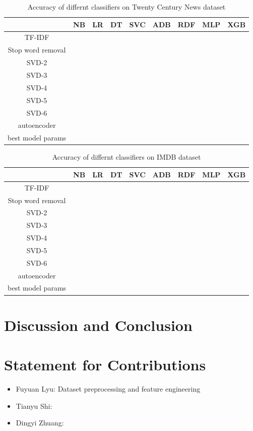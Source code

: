 \documentclass[11pt]{scrartcl}
\begin{document}
\begin{table}[H]
    \centering
    \begin{tabular}{c|cccccccc}
        \hline
         & NB   & LR & DT & SVC & ADB & RDF & MLP & XGB \\
        \hline
        TF-IDF & & & & & & & & \\
		Stop word removal & & & & & & & & \\
		SVD-2 & & & & & & & & \\
		SVD-3 & & & & & & & & \\
		SVD-4 & & & & & & & & \\
		SVD-5 & & & & & & & & \\
		SVD-6 & & & & & & & & \\
		autoencoder & & & & & & & & \\
		best model params & & & & & & & & \\
        \hline
    \end{tabular} 
    \caption{Accuracy of differnt classifiers on Twenty Century News dataset}
    \label{accuracy_20}
\end{table}

\begin{table}[H]
    \centering
    \begin{tabular}{c|cccccccc}
        \hline
         & NB   & LR & DT & SVC & ADB & RDF & MLP & XGB \\
        \hline
        TF-IDF & & & & & & & & \\
		Stop word removal & & & & & & & & \\
		SVD-2 & & & & & & & & \\
		SVD-3 & & & & & & & & \\
		SVD-4 & & & & & & & & \\
		SVD-5 & & & & & & & & \\
		SVD-6 & & & & & & & & \\
		autoencoder & & & & & & & & \\
		best model params & & & & & & & & \\
        \hline
    \end{tabular} 
    \caption{Accuracy of differnt classifiers on IMDB dataset}
    \label{accuracy_imdb}
\end{table}

\section{Discussion and Conclusion}

\section{Statement for Contributions}
\begin{itemize}
	\item Fuyuan Lyu: Dataset preprocessing and feature engineering
	\item Tianyu Shi:
	\item Dingyi Zhuang:
\end{itemize}



\end{document}
